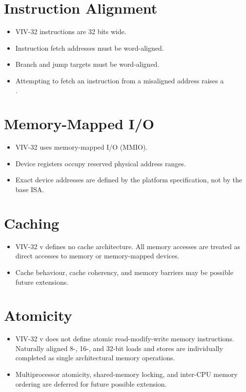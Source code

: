 \section{Instruction Alignment}

\begin{itemize}
  \item VIV-32 instructions are 32 bits wide.
  \item Instruction fetch addresses must be word-aligned.
  \item Branch and jump targets must be word-aligned.
  \item Attempting to fetch an instruction from a misaligned address raises a\\
        .
\end{itemize}

\section{Memory-Mapped I/O}

\begin{itemize}
  \item VIV-32 uses memory-mapped I/O (MMIO).
  \item Device registers occupy reserved physical address ranges.
  \item Exact device addresses are defined by the platform specification, not by
        the base ISA.
\end{itemize}

\section{Caching}

\begin{itemize}
  \item VIV-32 v\version{} defines no cache architecture. All memory accesses
        are treated as direct accesses to memory or memory-mapped devices.
  \item Cache behaviour, cache coherency, and memory barriers may be possible
        future extensions.
\end{itemize}

\section{Atomicity}

\begin{itemize}
  \item VIV-32 v\version{} does not define atomic read-modify-write memory
        instructions. Naturally aligned 8-, 16-, and 32-bit loads and stores are
        individually completed as single architectural memory operations.
  \item Multiprocessor atomicity, shared-memory locking, and inter-CPU memory
        ordering are deferred for future possible extension.
\end{itemize}

